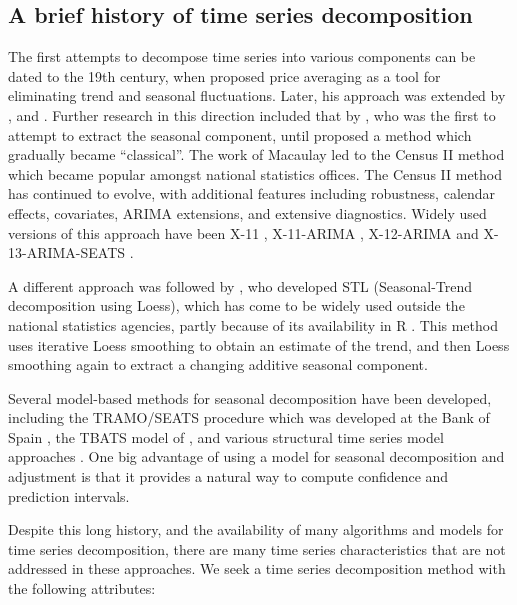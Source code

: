 \documentclass[11pt,a4paper,]{article}
\begin{document}
\hypertarget{a-brief-history-of-time-series-decomposition}{%
\subsection{A brief history of time series decomposition}\label{a-brief-history-of-time-series-decomposition}}

The first attempts to decompose time series into various components can be dated to the 19th century, when \textcite{Poynting1884} proposed price averaging as a tool for eliminating trend and seasonal fluctuations. Later, his approach was extended by \textcite{hooker1901suspension}, \textcite{spencer1904graduation} and \textcite{anderson1914nochmals}. Further research in this direction included that by \textcite{copeland1915statistical}, who was the first to attempt to extract the seasonal component, until \textcite{macaulay1930smooth} proposed a method which gradually became ``classical''. The work of Macaulay led to the Census II method \autocite{shiskin1957electronic} which became popular amongst national statistics offices. The Census II method has continued to evolve, with additional features including robustness, calendar effects, covariates, ARIMA extensions, and extensive diagnostics. Widely used versions of this approach have been X-11 \autocite{shishkin1967x}, X-11-ARIMA \autocite{dagum1988x11arima,ladiray2001seasonal}, X-12-ARIMA \autocite{findley1998new} and X-13-ARIMA-SEATS \autocite{findley2005some,Dagum2016}.

A different approach was followed by \textcite{cleveland1990stl}, who developed STL (Seasonal-Trend decomposition using Loess), which has come to be widely used outside the national statistics agencies, partly because of its availability in R \autocite{R}. This method uses iterative Loess smoothing to obtain an estimate of the trend, and then Loess smoothing again to extract a changing additive seasonal component.

Several model-based methods for seasonal decomposition have been developed, including the TRAMO/SEATS procedure which was developed at the Bank of Spain \autocite{Gomez2001}, the TBATS model of \textcite{delivera2011forecasting}, and various structural time series model approaches \autocite{harvey1990forecasting,Commandeur2011}. One big advantage of using a model for seasonal decomposition and adjustment is that it provides a natural way to compute confidence and prediction intervals.

Despite this long history, and the availability of many algorithms and models for time series decomposition, there are many time series characteristics that are not addressed in these approaches. We seek a time series decomposition method with the following attributes:
\end{document}
